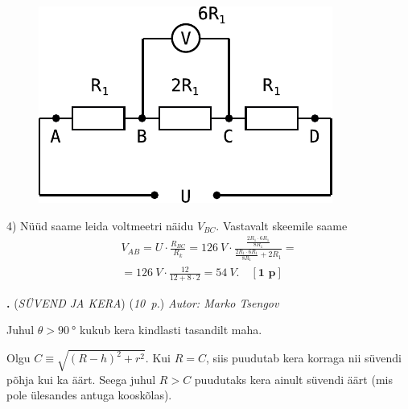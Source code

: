 \documentclass[11pt,a5paper]{article}
\newcommand{\numb}[1]{\vspace{5pt}\textbf{\large #1}}
\newcommand{\nimi}[1]{(\textsl{\small #1})}
\newcommand{\punktid}[1]{(\emph{#1~p.})}
\newcommand{\p}[1]{[\textbf{#1~p}]}
\newcounter{ylesanne}
\newcommand{\yl}[1]{\addtocounter{ylesanne}{1}\numb{\theylesanne.} \nimi{#1} \newblock{}}
\newcommand{\autor}[1]{\emph{Autor: #1}}%
\begin{document}
\begin{figure}
\vspace{-2em}
  \begin{center}
    \includegraphics[width=1\linewidth]{ahelad_efo4.pdf}
  \end{center}
\vspace{-5em}
\end{figure}

4) Nüüd saame leida voltmeetri näidu $V_{BC}$. Vastavalt skeemile saame
\begin{multline*}
V_{AB}=U\cdot\frac{R_{BC}}{R_k}=\SI{126}{V}\cdot\frac{\frac{2R_1\cdot6R_1}{8R_1}}{\frac{2R_1\cdot6R_1}{8R_1}+2R_1}=\\
=\SI{126}{V}\cdot\frac{12}{12+8\cdot2}=\SI{54}{V}. \quad \p{1}
\end{multline*}

\yl{SÜVEND JA KERA}
\punktid{10} \autor{Marko Tsengov}

Juhul $\theta > \SI{90}{\degree}$ kukub kera kindlasti tasandilt maha.

Olgu $C \equiv \sqrt{(R - h)^2 + r^2}$. Kui $R = C$, siis puudutab kera korraga nii süvendi põhja kui ka äärt. Seega juhul $R > C$ puudutaks kera ainult süvendi äärt (mis pole ülesandes antuga kooskõlas).
\end{document}
